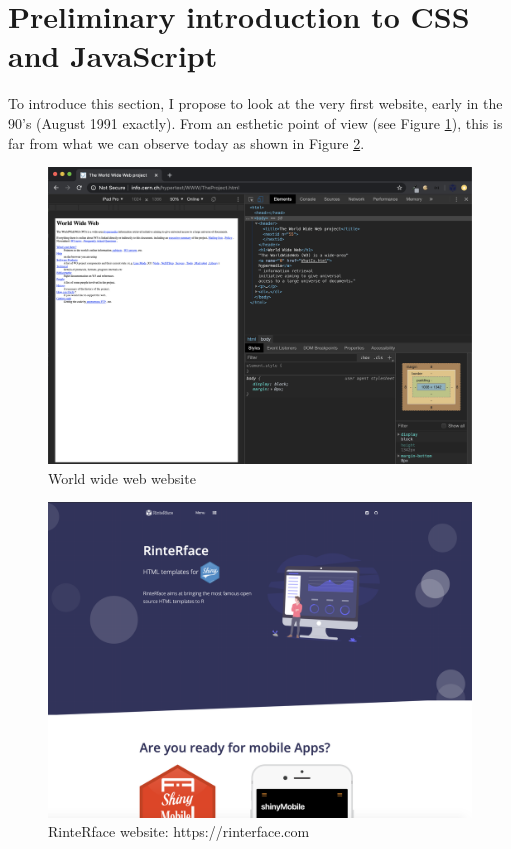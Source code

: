 \documentclass[
]{book}
\begin{document}
\hypertarget{preliminary-introduction-to-css-and-javascript}{%
\section{Preliminary introduction to CSS and JavaScript}\label{preliminary-introduction-to-css-and-javascript}}

To introduce this section, I propose to look at the very first website, early in the 90's (August 1991 exactly). From an esthetic point of view (see Figure \ref{fig:www-first}), this is far from what we can observe today as shown in Figure \ref{fig:www-rinterface}.

\begin{figure}
\includegraphics[width=33in]{images/survival-kit/www-first} \caption{World wide web website}\label{fig:www-first}
\end{figure}

\begin{figure}
\includegraphics[width=32.78in]{images/survival-kit/www-rinterface} \caption{RinteRface website: https://rinterface.com}\label{fig:www-rinterface}
\end{figure}
\end{document}
